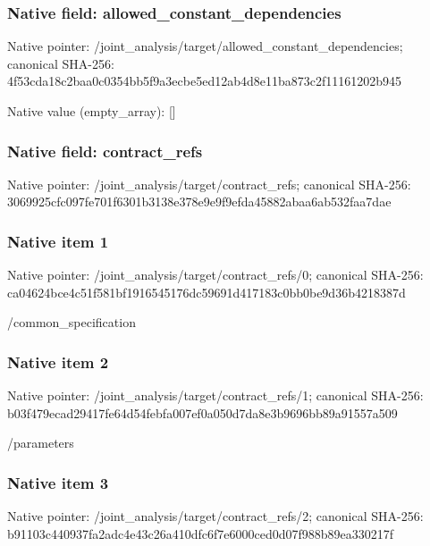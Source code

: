 \documentclass[10pt,a4paper]{article}
\begin{document}
\subsubsection{Native field: allowed\_constant\_dependencies}


Native pointer: /joint\_analysis/target/a\allowbreak{}llowed\_constant\_dependen\allowbreak{}cies; canonical SHA-256: 4f53cda18c2baa0c0354bb5f\allowbreak{}9a3ecbe5ed12ab4d8e11ba87\allowbreak{}3c2f11161202b945



Native value (empty\_array): []



\subsubsection{Native field: contract\_refs}


Native pointer: /joint\_analysis/target/contract\_refs; canonical SHA-256: 3069925cfc097fe701f6301b\allowbreak{}3138e378e9e9f9efda45882a\allowbreak{}baa6ab532faa7dae



\subsubsection{Native item 1}


Native pointer: /joint\_analysis/target/contract\_refs/0; canonical SHA-256: ca04624bce4c51f581bf1916\allowbreak{}545176dc59691d417183c0bb\allowbreak{}0be9d36b4218387d


/common\_specification


\subsubsection{Native item 2}


Native pointer: /joint\_analysis/target/contract\_refs/1; canonical SHA-256: b03f479ecad29417fe64d54f\allowbreak{}ebfa007ef0a050d7da8e3b96\allowbreak{}96bb89a91557a509


/parameters


\subsubsection{Native item 3}


Native pointer: /joint\_analysis/target/contract\_refs/2; canonical SHA-256: b91103c440937fa2adc4e43c\allowbreak{}26a410dfc6f7e6000ced0d07\allowbreak{}f988b89ea330217f
\end{document}

